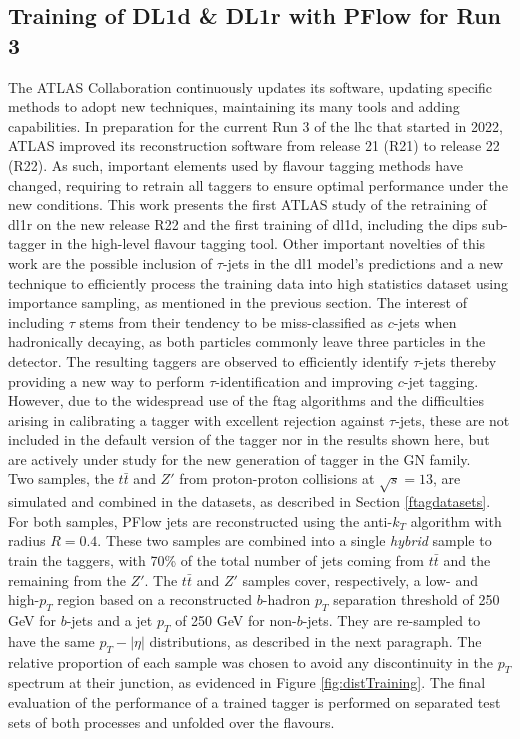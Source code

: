 \subsection{Training of DL1d \& DL1r with PFlow for Run 3}
The ATLAS Collaboration continuously updates its software, updating specific methods to adopt new techniques, maintaining its many tools and adding capabilities. In preparation for the current Run 3 of the \gls{lhc} that started in 2022, ATLAS improved its reconstruction software from release 21 (R21) to release 22 (R22). As such, important elements used by flavour tagging methods have changed, requiring to retrain all taggers to ensure optimal performance under the new conditions. This work presents the first ATLAS study of the retraining of \gls{dl1r} on the new release R22 and the first training of \gls{dl1d}, including the \gls{dips} sub-tagger in the high-level flavour tagging tool. Other important novelties of this work are the possible inclusion of $\tau$-jets in the \gls{dl1} model's predictions and a new technique to efficiently process the training data into high statistics dataset using importance sampling, as mentioned in the previous section. The interest of including $\tau$ stems from their tendency to be miss-classified as $c$-jets when hadronically decaying, as both particles commonly leave three particles in the detector. The resulting taggers are observed to efficiently identify $\tau$-jets thereby providing a new way to perform $\tau$-identification and improving $c$-jet tagging. However, due to the widespread use of the \gls{ftag} algorithms and the difficulties arising in calibrating a tagger with excellent rejection against $\tau$-jets, these are not included in the default version of the tagger nor in the results shown here, but are actively under study for the new generation of tagger in the GN family. \\ %
Two samples, the $t\bar{t}$ and $Z'$ from proton-proton collisions at $\sqrt{s} = 13$, are simulated and combined in the datasets, as described in Section \ref{ftagdatasets}. For both samples, PFlow jets are reconstructed using the anti-$k_T$ algorithm with radius $R = 0.4$. These two samples are combined into a single \textit{hybrid} sample to train the taggers, with 70\% of the total number of jets coming from $t\bar{t}$ and the remaining from the $Z'$. The $t\bar{t}$ and $Z'$ samples cover, respectively, a low- and high-$p_T$ region based on a reconstructed $b$-hadron $p_T$ separation threshold of 250 GeV for $b$-jets and a jet $p_T$ of 250 GeV for non-$b$-jets. They are re-sampled to have the same $p_T-|\eta|$ distributions, as described in the next paragraph. The relative proportion of each sample was chosen to avoid any discontinuity in the $p_T$ spectrum at their junction, as evidenced in Figure \ref{fig:distTraining}. The final evaluation of the performance of a trained tagger is performed on separated test sets of both processes and unfolded over the flavours.\\

